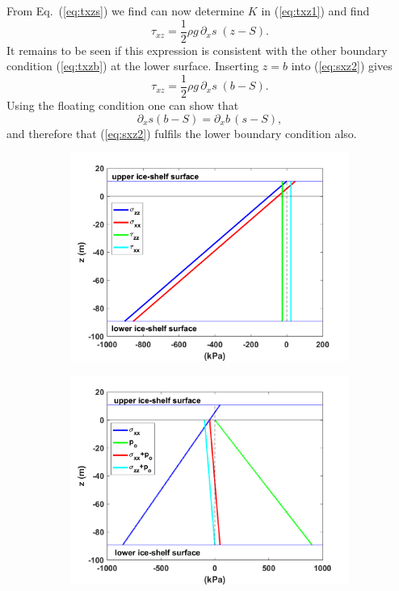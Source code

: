 \documentclass[10pt,a4paper]{book}
\newcommand{\p}{\partial}
\newcommand{\txz}{\tau_{xz}}
\begin{document}
From Eq.~(\ref{eq:txzs}) we find can now determine $K$ in (\ref{eq:txz1}) and find
\begin{equation}
\txz=\frac{1}{2} \rho g \, \p_x s \; (z-S) .
\label{eq:sxz2}
\end{equation}
It remains to be seen if this expression is consistent with the other
boundary condition (\ref{eq:txzb}) at the lower surface. Inserting
$z=b$ into (\ref{eq:sxz2}) gives
\begin{equation} 
\txz=\frac{1}{2} \rho g \, \p_x s \; (b-S) .
\label{eq:sxz3}
\end{equation}
Using the floating condition one can show that
\[
\p_x s (b-S) = \p_x b \, (s-S),
\]
and therefore that (\ref{eq:sxz2}) fulfils the lower boundary condition also.


\begin{figure}
\begin{subfigure}{0.5\textwidth}
\centering
\includegraphics[width=\textwidth]{IceShelfStresses.png}
\end{subfigure}
\begin{subfigure}{0.5\textwidth}
\centering
\includegraphics[width=\textwidth]{IceShelfStressesAndPressure.png}

\end{subfigure}
\end{figure}
\end{document}
